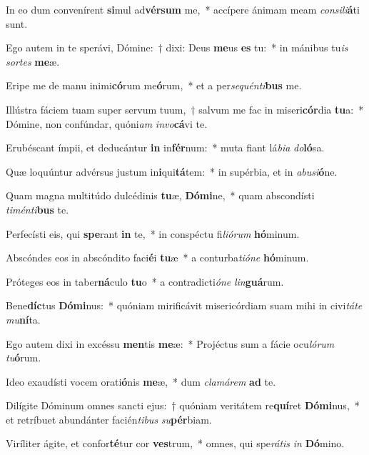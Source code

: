 \item In eo dum convenírent \textbf{si}mul ad\textbf{vér}\textbf{sum} me,~* accípere ánimam meam \textit{con}\textit{si}\textit{li}\textbf{á}ti sunt.
\item Ego autem in te sperávi, Dómine:~† dixi: Deus \textbf{me}us \textbf{es} tu:~* in mánibus tu\textit{is} \textit{sor}\textit{tes} \textbf{me}æ.
\item Eripe me de manu inimi\textbf{có}rum me\textbf{ó}rum,~* et a per\textit{se}\textit{quén}\textit{ti}\textbf{bus} me.
\item Illústra fáciem tuam super servum tuum,~† salvum me fac in miseri\textbf{cór}dia \textbf{tu}a:~* Dómine, non confúndar, quóni\textit{am} \textit{in}\textit{vo}\textbf{cá}vi te.
\item Erubéscant ímpii, et deducántur \textbf{in} in\textbf{fér}num:~* muta fiant lá\textit{bi}\textit{a} \textit{do}\textbf{ló}sa.
\item Quæ loquúntur advérsus justum in\textbf{i}qui\textbf{tá}tem:~* in supérbia, et in \textit{ab}\textit{u}\textit{si}\textbf{ó}ne.
\item Quam magna multitúdo dulcédinis \textbf{tu}æ, \textbf{Dó}\textbf{mi}ne,~* quam abscondísti \textit{ti}\textit{mén}\textit{ti}\textbf{bus} te.
\item Perfecísti eis, qui \textbf{spe}rant \textbf{in} te,~* in conspéctu fi\textit{li}\textit{ó}\textit{rum} \textbf{hó}minum.
\item Abscóndes eos in abscóndito faci\textbf{é}i \textbf{tu}æ~* a conturba\textit{ti}\textit{ó}\textit{ne} \textbf{hó}minum.
\item Próteges eos in taber\textbf{ná}culo \textbf{tu}o~* a contradicti\textit{ó}\textit{ne} \textit{lin}\textbf{guá}rum.
\item Bene\textbf{díc}tus \textbf{Dó}\textbf{mi}nus:~* quóniam mirificávit misericórdiam suam mihi in civi\textit{tá}\textit{te} \textit{mu}\textbf{ní}ta.
\item Ego autem dixi in excéssu \textbf{men}tis \textbf{me}æ:~* Projéctus sum a fácie ocu\textit{ló}\textit{rum} \textit{tu}\textbf{ó}rum.
\item Ideo exaudísti vocem orati\textbf{ó}nis \textbf{me}æ,~* dum \textit{cla}\textit{má}\textit{rem} \textbf{ad} te.
\item Dilígite Dóminum omnes sancti ejus:~† quóniam veritátem re\textbf{quí}ret \textbf{Dó}\textbf{mi}nus,~* et retríbuet abundánter facién\textit{ti}\textit{bus} \textit{su}\textbf{pér}biam.
\item Viríliter ágite, et confor\textbf{té}tur cor \textbf{ves}trum,~* omnes, qui spe\textit{rá}\textit{tis} \textit{in} \textbf{Dó}mino.
